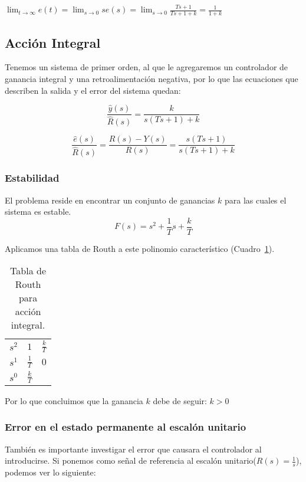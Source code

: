\begin{math}
\displaystyle \lim_{t \to \infty} e(t) = \lim_{s \to 0} s e(s) = \lim_{s \to 0} \frac{Ts + 1}{Ts + 1 + k} = \frac{1}{1 + k}
\end{math}

\subsection{Acción Integral}
Tenemos un sistema de primer orden, al que le agregaremos un controlador de ganancia integral y una retroalimentación negativa, por lo que las ecuaciones que describen la salida y el error del sistema quedan:

\begin{equation}
\frac{\hat{y}(s)}{\hat{R}(s)} = \frac{k}{s(Ts + 1) + k}
\end{equation}

\begin{equation}
\frac{\hat{e}(s)}{\hat{R}(s)} = \frac{R(s) - Y(s)}{R(s)} = \frac{s(Ts + 1)}{s(Ts + 1) + k}
\end{equation}

\subsubsection{Estabilidad}
El problema reside en encontrar un conjunto de ganancias $k$ para las cuales el sistema es estable.
\begin{equation}
F(s) = s^2 + \frac{1}{T} s + \frac{k}{T}
\end{equation}

Aplicamos una tabla de Routh a este polinomio característico (Cuadro~\ref{tab:AccionIntegral}).

\begin{table}[htbp]
\centering
\begin{tabular}{c|c c}
$s^2$ & $1$ & $\frac{k}{T}$ \\
$s^1$ & $\frac{1}{T}$ & $0$ \\
$s^0$ & $\frac{k}{T}$
\end{tabular}
\caption{\label{tab:AccionIntegral}Tabla de Routh para acción integral.}
\end{table}

Por lo que concluimos que la ganancia $k$ debe de seguir: $k>0$

\subsubsection{Error en el estado permanente al escalón unitario}
También es importante investigar el error que causara el controlador al introducirse. Si ponemos como señal de referencia al escalón unitario($R(s) = \frac{1}{s}$), podemos ver lo siguiente:

